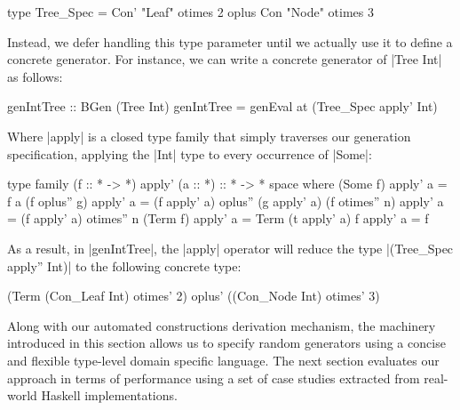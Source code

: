 \begin{code}
type Tree_Spec
  =      Con'  "Leaf"  otimes 2
  oplus  Con   "Node"  otimes 3
\end{code}

Instead, we defer handling this type parameter until we actually use it to
define a concrete generator.
%
For instance, we can write a concrete generator of |Tree Int| as follows:

\begin{code}
genIntTree :: BGen (Tree Int)
genIntTree = genEval at (Tree_Spec apply' Int)
\end{code}

Where |apply| is a closed type family that simply traverses our generation
specification, applying the |Int| type to every occurrence of |Some|:

\begin{code}
type family (f :: * -> *) apply' (a :: *) :: * -> * space where
  (Some f)         apply'  a  = f a
  (f oplus''  g)   apply'  a  = (f apply' a) oplus'' (g apply' a)
  (f otimes'' n)   apply'  a  = (f apply' a) otimes'' n
  (Term f)         apply'  a  = Term (t apply' a)
  f                apply'  a  = f
\end{code}
%
As a result, in |genIntTree|, the |apply| operator will reduce the type
|(Tree_Spec apply'' Int)| to the following concrete type:

\begin{code}
(Term (Con_Leaf Int) otimes' 2) oplus' ((Con_Node Int) otimes' 3)
\end{code}


Along with our automated constructions derivation mechanism, the machinery
introduced in this section allows us to specify random generators using a
concise and flexible type-level domain specific language.
%
The next section evaluates our approach in terms of performance using a set of
case studies extracted from real-world Haskell implementations.
